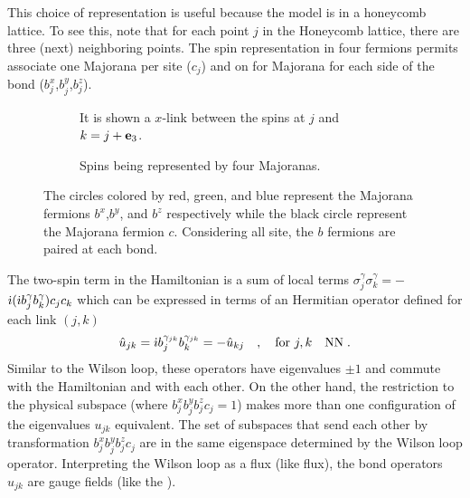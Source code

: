 This choice of representation is useful because the model is in a honeycomb lattice. To see this, note that for each point $j$ in the Honeycomb lattice, there are three (next) neighboring points. The spin representation in four fermions permits associate one Majorana per site ($c_j$) and on for Majorana for each side of the bond ($b_j^x$,$b_j^y$,$b_j^z$).

\begin{figure}[t]
    \centering
    \begin{subfigure}{.45\textwidth}
        \centering
        \scalebox{1.8}{ } 
        \caption{It is shown a $x$-link between the spins at $j$ and $k=j+\bf{e}_3$.}
        \label{fig:2-spin-to-maj1}
    \end{subfigure} \hspace{5mm}%
    \begin{subfigure}{.45\textwidth}
        \centering
        \scalebox{0.5}{ }
        \caption{Spins being represented by four Majoranas.}
        \label{fig:2-spin-to-majorana2}
    \end{subfigure}
\caption{The circles colored by red, green, and blue represent the Majorana fermions $b^{x}$,$b^{y}$, and $b^{z}$ respectively while the black circle represent the Majorana fermion $c$. Considering all site, the $b$ fermions are paired at each bond. }
\end{figure}


The two-spin term in the  Hamiltonian is a sum of local terms $\sigma^{\gamma}_{j} \sigma^{\gamma}_{k} = -$ $ \im ( \im b^{\gamma}_{j} b^{\gamma}_{k} ) c_{j} c_{k}$ which can be expressed in terms of an Hermitian operator defined for each link $(j,k)$
\begin{equation}
    \hat{u}_{jk} = \im b_{j}^{\gamma_{jk}} b_{k}^{\gamma_{jk}} = -\hat{u}_{kj}  \quad , \quad \text{for } j,k \quad \text{NN} \;  .
\end{equation}
Similar to the Wilson loop, these operators have eigenvalues $\pm 1$  and commute with the Hamiltonian and with each other. On the other hand, the restriction to the physical subspace (where $b^{x}_{j} b^{y}_{j} b^{z}_{j}  c_{j} = 1$) makes more than one configuration of the eigenvalues $u_{jk}$ equivalent. The set of subspaces that send each other by transformation $b^{x}_{j} b^{y}_{j} b^{z}_{j}  c_{j}$ are in the same eigenspace determined by the Wilson loop operator. Interpreting the Wilson loop as a flux (like  flux), the bond operators $\hat{u}_{jk}$ are gauge fields (like the ).

